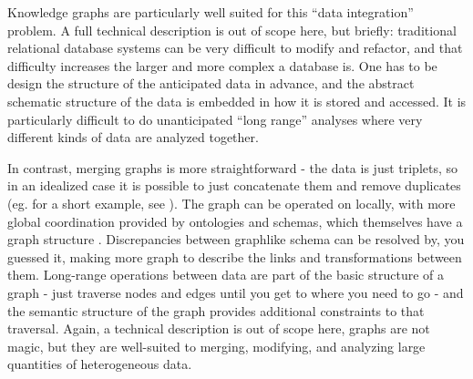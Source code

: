 Knowledge graphs are particularly well suited for this ``data
integration'' problem. A full technical description is out of scope
here, but briefly: traditional relational database systems can be very
difficult to modify and refactor, and that difficulty increases the
larger and more complex a database is. One has to be design the structure of the
anticipated data in advance, and the abstract schematic structure of the
data is embedded in how it is stored and accessed. It is particularly
difficult to do unanticipated ``long range'' analyses where very
different kinds of data are analyzed together.

In contrast, merging graphs is more straightforward \cite{chaudhriKnowledgeGraphsIntroduction2022, enterpriseknowledgegraphfoundationKnowledgeGraphIndustry2022, schenkerNewReportDetails2021, sequedaDesigningBuildingEnterprise2021, azziniAdvancesDataManagement2021, segaranTwophaseConstructionData2020, ceravoloBigDataSemantics2018, natarajanGraphKnowledgeGraph}  - the
data is just triplets, so in an idealized case it is possible to just
concatenate them and remove duplicates (eg. for a short example, see
\cite{allemangMergingDataGraphs2022, allemangMergingTablesHard2022} ). The graph can be operated on locally, with more global
coordination provided by ontologies and schemas, which themselves have a
graph structure \cite{villazon-terrazasKnowledgeGraphFoundations2017} . Discrepancies between graphlike schema can be resolved by, you
guessed it, making more graph to describe the links and transformations
between them. Long-range operations between data are part of the basic
structure of a graph - just traverse nodes and edges until you get to
where you need to go - and the semantic structure of the graph provides
additional constraints to that traversal. Again, a technical description
is out of scope here, graphs are not magic, but they are well-suited to
merging, modifying, and analyzing large quantities of heterogeneous
data.

